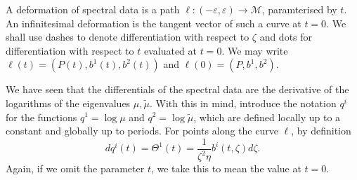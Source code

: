 A deformation of spectral data is a path $\ell:(-ε,ε) \to \mathcal{M}$, paramterised by $t$. An infinitesimal deformation is the tangent vector of such a curve at $t=0$. We shall use dashes to denote differentiation with respect to $\zeta$ and dots for differentiation with respect to $t$ evaluated at $t=0$. We may write $\ell(t) = (P(t),b^1(t),b^2(t))$ and $\ell(0) = (P,b^1,b^2)$.

We have seen that the differentials of the spectral data are the derivative of the logarithms of the eigenvalues $μ,\tilde{μ}$. With this in mind, introduce the notation $q^i$ for the functions $q^1 = \log μ$ and $q^2 = \log \tilde{μ}$, which are defined locally up to a constant and globally up to periods. For points along the curve $\ell$, by definition
\[
dq^i(t) = Θ^1(t) = \frac{1}{\zeta^2\eta}b^i(t,\zeta) d\zeta.
\]
Again, if we omit the parameter $t$, we take this to mean the value at $t=0$.


